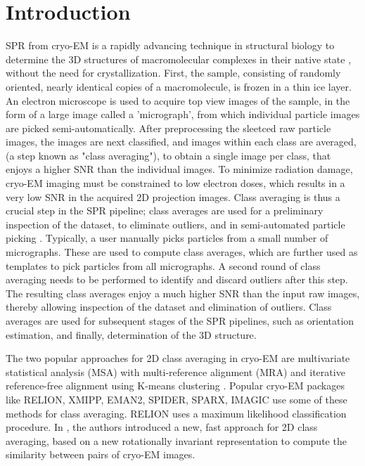 \documentclass{article}
\begin{document}
\section{Introduction}
\label{sec:intro}
SPR from cryo-EM is a rapidly advancing technique in structural biology to determine
the 3D structures of macromolecular complexes in their native state \cite{Frank1, Kuhlbrandt1443},
 without the need for crystallization. First, the sample, consisting of randomly oriented, nearly identical copies of a macromolecule, is frozen in a thin ice layer. An electron microscope is used to acquire top view images of the sample, in the form of a large image called a 'micrograph', from which individual particle images are picked semi-automatically. After preprocessing the sleetced raw particle images, the images are next classified, and images within each class are averaged, (a step known as "class averaging"), to obtain a single image per class, that enjoys a higher SNR than the individual images. To minimize radiation damage, cryo-EM imaging must be constrained to low electron doses, which results in a very low SNR in the acquired 2D projection images. Class averaging is thus a crucial step in the SPR pipeline; class averages are used for a preliminary inspection of the dataset, to eliminate outliers, and in semi-automated particle picking \cite{relion}. Typically, a user manually picks particles from a small number of micrographs. These are used to compute class averages, which are further used as templates to pick particles from all micrographs. A second round of class averaging needs to be performed to identify and discard outliers after this step. The resulting class averages enjoy a much higher SNR than the input raw images, thereby allowing inspection of the dataset and elimination of outliers. Class averages are used for subsequent stages of the SPR pipelines, such as orientation estimation, and finally, determination of the 3D structure.
 
The two popular approaches for 2D class averaging \cite{Penczek1992,Penczek1996, vanHeel1990a, vanHeel1981} in cryo-EM are multivariate statistical analysis (MSA)\cite{vanHeel1981} with multi-reference alignment (MRA) \cite{Dube1993} and iterative reference-free alignment using K-means clustering \cite{Penczek1996}. Popular cryo-EM packages like RELION, XMIPP, EMAN2, SPIDER, SPARX, IMAGIC \cite{imagic, spider, eman2, xmipp, relion, gpurelion} use some of these methods for class averaging. RELION uses a maximum likelihood classification procedure. 
In \cite{zhao}, the authors introduced a new, fast approach for 2D class averaging, based on a new rotationally invariant representation to compute the similarity between pairs of cryo-EM images.
\end{document}
